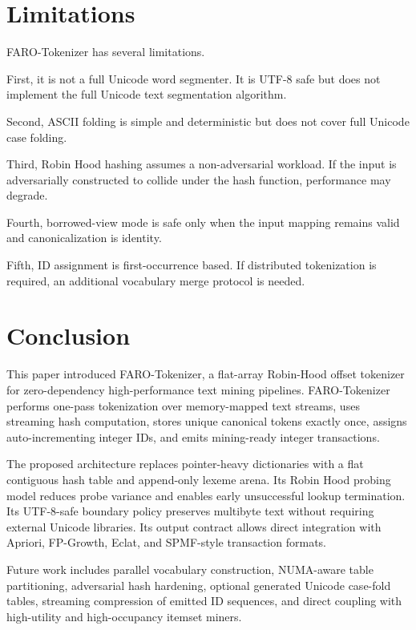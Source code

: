 \documentclass[11pt,a4paper]{article}
\begin{document}
\section{Limitations}

FARO-Tokenizer has several limitations.

First, it is not a full Unicode word segmenter. It is UTF-8 safe but does not implement the full Unicode text segmentation algorithm.

Second, ASCII folding is simple and deterministic but does not cover full Unicode case folding.

Third, Robin Hood hashing assumes a non-adversarial workload. If the input is adversarially constructed to collide under the hash function, performance may degrade.

Fourth, borrowed-view mode is safe only when the input mapping remains valid and canonicalization is identity.

Fifth, ID assignment is first-occurrence based. If distributed tokenization is required, an additional vocabulary merge protocol is needed.

\section{Conclusion}

This paper introduced FARO-Tokenizer, a flat-array Robin-Hood offset tokenizer for zero-dependency high-performance text mining pipelines. FARO-Tokenizer performs one-pass tokenization over memory-mapped text streams, uses streaming hash computation, stores unique canonical tokens exactly once, assigns auto-incrementing integer IDs, and emits mining-ready integer transactions.

The proposed architecture replaces pointer-heavy dictionaries with a flat contiguous hash table and append-only lexeme arena. Its Robin Hood probing model reduces probe variance and enables early unsuccessful lookup termination. Its UTF-8-safe boundary policy preserves multibyte text without requiring external Unicode libraries. Its output contract allows direct integration with Apriori, FP-Growth, Eclat, and SPMF-style transaction formats.

Future work includes parallel vocabulary construction, NUMA-aware table partitioning, adversarial hash hardening, optional generated Unicode case-fold tables, streaming compression of emitted ID sequences, and direct coupling with high-utility and high-occupancy itemset miners.
\end{document}
